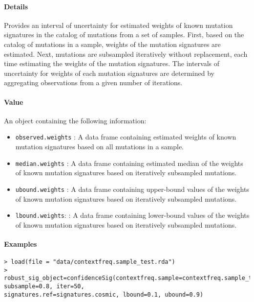 \documentclass[]{article}
\providecommand{\tightlist}{%
  \setlength{\itemsep}{0pt}\setlength{\parskip}{0pt}}
\let\oldparagraph\paragraph
\renewcommand{\paragraph}[1]{\oldparagraph{#1}\mbox{}}
\begin{document}
\paragraph{\texorpdfstring{\textbf{Details}}{Details}}\label{details-6}

Provides an interval of uncertainty for estimated weights of known
mutation signatures in the catalog of mutations from a set of samples.
First, based on the catalog of mutations in a sample, weights of the
mutation signatures are estimated. Next, mutations are subsampled
iteratively without replacement, each time estimating the weights of the
mutation signatures. The intervals of uncertainty for weights of each
mutation signatures are determined by aggregating observations from a
given number of iterations.

\paragraph{\texorpdfstring{\textbf{Value}}{Value}}\label{value-8}

An object containing the following information:

\begin{itemize}
\tightlist
\item
  \texttt{observed.weights} : A data frame containing estimated weights
  of known mutation signatures based on all mutations in a sample.
\item
  \texttt{median.weights} : A data frame containing estimated median of
  the weights of known mutation signatures based on iteratively
  subsampled mutations.
\item
  \texttt{ubound.weights} : A data frame containing upper-bound values
  of the weights of known mutation signatures based on iteratively
  subsampled mutations.
\item
  \texttt{lbound.weights}: : A data frame containing lower-bound values
  of the weights of known mutation signatures based on iteratively
  subsampled mutations.
\end{itemize}

\paragraph{\texorpdfstring{\textbf{Examples}}{Examples}}\label{examples-10}

\begin{verbatim}
> load(file = "data/contextfreq.sample_test.rda")
> robust_sig_object=confidenceSig(contextfreq.sample=contextfreq.sample_test, subsample=0.8, iter=50, 
signatures.ref=signatures.cosmic, lbound=0.1, ubound=0.9)
\end{verbatim}
\end{document}
